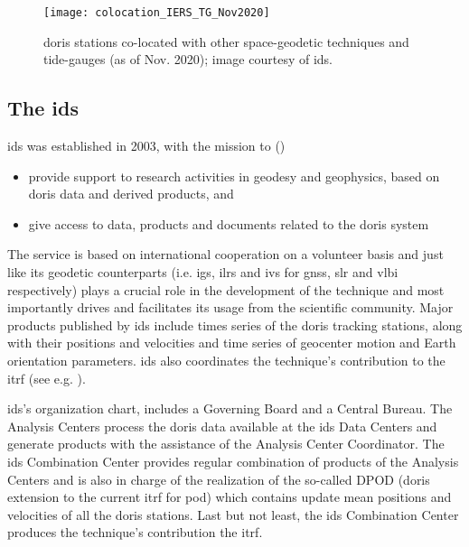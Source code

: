 \begin{figure}[h]
  \centering
  \texttt{[image: colocation\_IERS\_TG\_Nov2020]}
  \caption{\gls{doris} stations co-located with other space-geodetic techniques 
    and tide-gauges (as of Nov. 2020); image courtesy of \gls{ids}.}
  \label{fig:doris-network-ties}
\end{figure}

\subsection{The \gls{ids}}\label{ssec:ids}
\gls{ids} was established in 2003, with the mission to (\cite{Soudarin2019})
\begin{itemize}
  \item provide support to research activities in geodesy and geophysics, based 
    on \gls{doris} data and derived products, and
  \item give access to data, products and documents related to the \gls{doris} system
\end{itemize}

The service is based on international cooperation on a volunteer basis and just like 
its geodetic counterparts (i.e. \gls{igs}, \gls{ilrs} and \gls{ivs} for \gls{gnss}, 
\gls{slr} and \gls{vlbi} respectively) plays a crucial role in the development of 
the technique and most importantly drives and facilitates its usage from the scientific 
community. Major products published by \gls{ids} include times series of the \gls{doris} 
tracking stations, along with their positions and velocities  and time series of 
geocenter motion and Earth orientation parameters. \gls{ids} also coordinates the 
technique's contribution to the \gls{itrf} (see e.g. \cite{Moreaux2022}).

\gls{ids}'s organization chart, includes a Governing Board and a Central Bureau.
The Analysis Centers process the \gls{doris} data available at the \gls{ids} Data 
Centers and generate products with the assistance of the Analysis Center Coordinator.
The \gls{ids} Combination Center provides regular combination of products of 
the Analysis Centers and is also in charge of the realization of the so-called 
DPOD (\gls{doris} extension to the current \gls{itrf} for \gls{pod}) 
which contains update mean positions and velocities of all the \gls{doris} stations. 
Last but not least, the \gls{ids} Combination Center produces the technique's 
contribution the \gls{itrf}.

\iffalse
\fi
